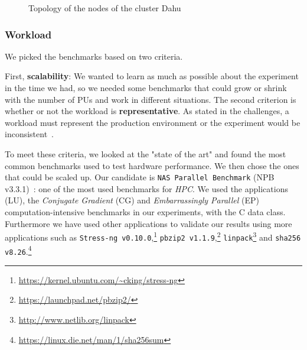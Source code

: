 \begin{figure}[htb]
    \caption{Topology of the nodes of the cluster \textsf{Dahu}}\label{fig:topo}
\end{figure}

\subsubsection{Workload}

We picked the benchmarks based on two criteria.

First, \textbf{scalability}: We wanted to learn as much as possible about the experiment in the time we had, so we needed some benchmarks that could grow or shrink with the number of PUs and work in different situations.
The second criterion is whether or not the workload is \textbf{representative}. As stated in the challenges, a workload must represent the production environment or the experiment would be inconsistent~\cite{stephen_evaluate_2012}.

To meet these criteria, we looked at the "state of the art" and found the most common benchmarks used to test hardware performance. We then chose the ones that could be scaled up.
Our candidate is \texttt{NAS Parallel Benchmark} (NPB v3.3.1)~\cite{Bailey:1991:NPB:125826.125925}: one of the most used benchmarks for \emph{HPC}. We used the applications (\textsf{LU}), the \emph{Conjugate Gradient} (\textsf{CG}) and \emph{Embarrassingly Parallel} (\textsf{EP}) computation-intensive benchmarks in our experiments, with the \textsf{C} data class.
Furthermore we have used other applications to validate our results using more applications such as \texttt{Stress-ng v0.10.0},\footnote{\url{https://kernel.ubuntu.com/~cking/stress-ng}} \texttt{pbzip2 v1.1.9},\footnote{\url{https://launchpad.net/pbzip2/}} \texttt{linpack}\footnote{\url{http://www.netlib.org/linpack}} and \texttt{sha256 v8.26}.\footnote{\url{https://linux.die.net/man/1/sha256sum}}


